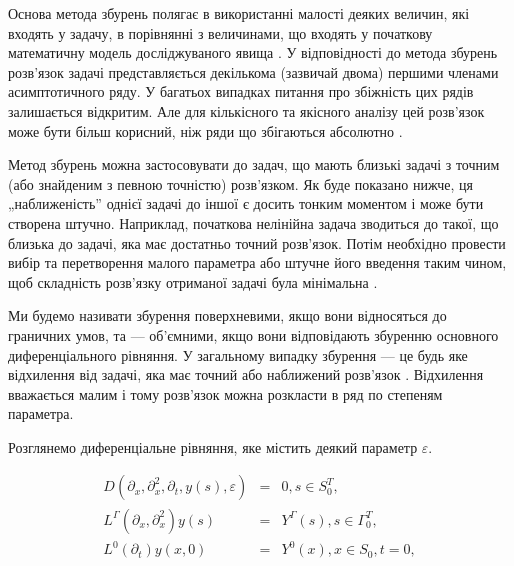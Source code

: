 Основа метода збурень полягає в використанні малості деяких величин, які входять  у задачу, в порівнянні з
величинами, що входять у початкову математичну модель досліджуваного явища
\cite{Aizen-KvoprosuPrimeneniya, Aizen-ReshenieNelineynoyZadachi, Baylens-ReshenieMetodom, Van-Dayk-Metody,
KozdobaChumakov-MetodyPrimeneniya, KozdobaChumakov-ReshenieVosmushenien, KozdobaChumakov-ReshenieMalymParametrom,
Nayfe-Vvedenie, Novikov-sintez, Olson-Primenenie, Furman-Reshenie, Erdein-Asimptoticheskie}.
У відповідності до метода збурень розв’язок задачі представляється декількома (зазвичай двома) першими членами
асимптотичного ряду. У багатьох випадках питання про збіжність цих рядів залишається відкритим.
Але для кількісного та якісного аналізу цей розв’язок може бути більш корисний, ніж ряди що збігаються абсолютно
\cite{Nayfe-Vvedenie}.

Метод збурень можна застосовувати до задач, що мають близькі задачі з точним (або знайденим з певною точністю)
розв’язком. Як буде показано нижче, ця „наближеність” однієї задачі до іншої є досить тонким моментом і може
бути створена штучно. Наприклад, початкова нелінійна задача зводиться до такої, що близька до задачі,
яка має достатньо точний розв’язок. Потім необхідно провести вибір та перетворення малого параметра або штучне
його введення таким чином, щоб складність розв’язку отриманої задачі була мінімальна \cite{KozdobaChumakov-MetodyPrimeneniya}.

Ми будемо називати збурення поверхневими, якщо вони відносяться до граничних умов, та — об’ємними, якщо вони
відповідають збуренню основного диференціального  рівняння. У загальному випадку збурення — це
будь яке відхилення від задачі, яка має  точний або наближений розв’язок \cite{Mors-metody}.
Відхилення вважається малим і тому розв’язок можна розкласти в ряд по степеням параметра.

Розглянемо диференціальне рівняння, яке містить деякий параметр $\varepsilon$.

\begin{equation}
  \label{eq:eq_epsylon}
\begin{array}{rcl}
D(\partial_x, \partial_x^2, \partial_t, y(s), \varepsilon) & = & 0, s\in S_0^T, \\
L^\Gamma(\partial_x, \partial_x^2)y(s) & = & Y^\Gamma(s), s \in \Gamma_0^T, \\
L^0(\partial_t)y(x, 0) & = & Y^0(x), x \in S_0, t = 0,
\end{array}
\end{equation}

